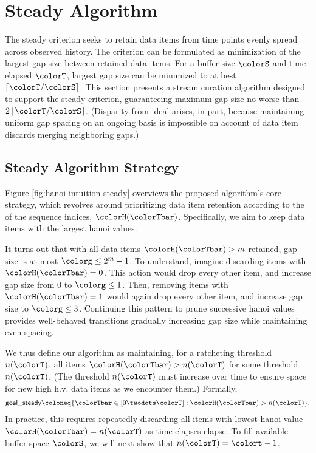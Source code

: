 \section{Steady Algorithm} \label{sec:steady}

The steady criterion seeks to retain data items from time points evenly spread across observed history.
The criterion can be formulated as minimization of the largest gap size between retained data items.
For a buffer size $\colorS$ and time elapsed $\colorT$, largest gap size can be minimized to at best $\left\lceil \colorT / \colorS \right\rceil$.
This section presents a stream curation algorithm designed to support the steady criterion, guaranteeing maximum gap size no worse than $2\left\lceil \colorT / \colorS \right\rceil$.
(Disparity from ideal arises, in part, because maintaining uniform gap spacing on an ongoing basis is impossible on account of data item discards merging neighboring gaps.)

\subsection{Steady Algorithm Strategy}
\label{sec:steady-strategy}

Figure \ref{fig:hanoi-intuition-steady} overviews the proposed algorithm's core strategy, which revolves around prioritizing data item retention according to the \hv{} of the sequence indices, $\colorH(\colorTbar)$.
Specifically, we aim to keep data items with the largest hanoi values.

It turns out that with all data items $\colorH(\colorTbar) > m$ retained, gap size is at most $\colorg \leq 2^m - 1$.
To understand, imagine discarding items with $\colorH(\colorTbar) = 0$.
This action would drop every other item, and increase gap size from 0 to $\colorg \leq 1$.
Then, removing items with $\colorH(\colorTbar) = 1$ would again drop every other item, and increase gap size to $\colorg \leq 3$.
Continuing this pattern to prune successive hanoi values provides well-behaved transitions gradually increasing gap size while maintaining even spacing.

We thus define our algorithm as maintaining, for a ratcheting threshold $n(\colorT)$, all items $\colorH(\colorTbar) > n(\colorT)$ for some threshold $n(\colorT)$.
(The threshold $n(\colorT)$ must increase over time to ensure space for new high h.v. data items as we encounter them.)
Formally,
\begin{align*}
\textsf{goal\_steady}
\coloneq \{
\colorTbar \in [0 \twodots \colorT]
: \colorH(\colorTbar) > n(\colorT)
\}.
\end{align*}
In practice, this requires repeatedly discarding all items with lowest hanoi value $\colorH(\colorTbar) = n(\colorT)$ as time elapses elapse.
To fill available buffer space $\colorS$, we will next show that $n(\colorT) = \colort - 1$.

